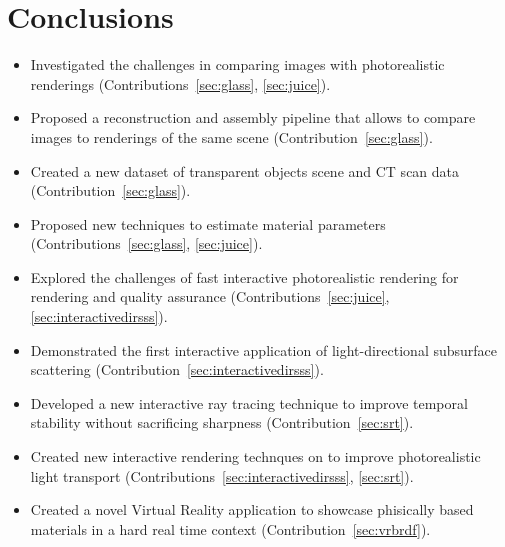 \chapter{Conclusions}
\label{sec:conclusion}
\begin{itemize}
\item Investigated the challenges in comparing images with photorealistic renderings (Contributions~\ref{sec:glass}, \ref{sec:juice}).
\item Proposed a reconstruction and assembly pipeline that allows to compare images to renderings of the same scene (Contribution~\ref{sec:glass}).
\item Created a new dataset of transparent objects scene and CT scan data (Contribution~\ref{sec:glass}).
\item Proposed new techniques to estimate material parameters (Contributions~\ref{sec:glass}, \ref{sec:juice}).
\item Explored the challenges of fast interactive photorealistic rendering for rendering and quality assurance (Contributions~\ref{sec:juice},\ref{sec:interactivedirsss}).
\item Demonstrated the first interactive application of light-directional subsurface scattering (Contribution~\ref{sec:interactivedirsss}).
\item Developed a new interactive ray tracing technique to improve temporal stability without sacrificing sharpness (Contribution~\ref{sec:srt}).
\item Created new interactive rendering technques on to improve photorealistic light transport (Contributions~\ref{sec:interactivedirsss}, \ref{sec:srt}).
\item Created a novel Virtual Reality application to showcase phisically based materials in a hard real time context (Contribution~\ref{sec:vrbrdf}).
\end{itemize}